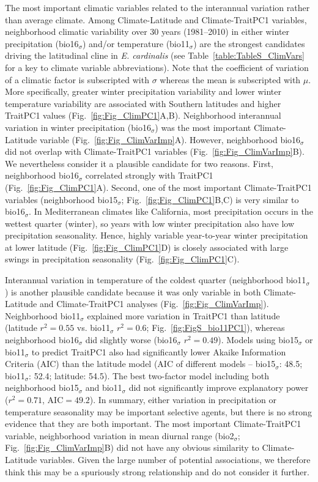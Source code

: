 \documentclass[11pt, oneside]{article}
\begin{document}
The most important climatic variables related to the interannual variation rather than average climate. Among Climate-Latitude and Climate-TraitPC1 variables, neighborhood climatic variability over 30 years (1981--2010) in either winter precipitation (bio16$_\sigma$) and/or temperature (bio11$_\sigma$) are the strongest candidates driving the latitudinal cline in \textit{E. cardinalis} (see Table~\ref{table:TableS_ClimVars} for a key to climate variable abbreviations). Note that the coefficient of variation of a climatic factor is subscripted with $\sigma$ whereas the mean is subscripted with $\mu$. More specifically, greater winter precipitation variability and lower winter temperature variability are associated with Southern latitudes and higher TraitPC1 values (Fig.~\ref{fig:Fig_ClimPC1}A,B). Neighborhood interannual variation in winter precipitation (bio16$_\sigma$) was the most important Climate-Latitude variable (Fig.~\ref{fig:Fig_ClimVarImp}A). However, neighborhood bio16$_\sigma$ did not overlap with Climate-TraitPC1 variables (Fig.~\ref{fig:Fig_ClimVarImp}B). We nevertheless consider it a plausible candidate for two reasons. First, neighborhood bio16$_\sigma$ correlated strongly with TraitPC1 (Fig.~\ref{fig:Fig_ClimPC1}A). Second, one of the most important Climate-TraitPC1 variables (neighborhood bio15$_\sigma$; Fig.~\ref{fig:Fig_ClimPC1}B,C) is very similar to bio16$_\sigma$. In Mediterranean climates like California, most precipitation occurs in the wettest quarter (winter), so years with low winter precipitation also have low precipitation seasonality. Hence, highly variable year-to-year winter precipitation at lower latitude (Fig.~\ref{fig:Fig_ClimPC1}D) is closely associated with large swings in precipitation seasonality (Fig.~\ref{fig:Fig_ClimPC1}C). 

Interannual variation in temperature of the coldest quarter (neighborhood bio11$_\sigma$) is another plausible candidate because it was only variable in both Climate-Latitude and Climate-TraitPC1 analyses (Fig.~\ref{fig:Fig_ClimVarImp}). Neighborhood bio11$_\sigma$ explained more variation in TraitPC1 than latitude (latitude $r^2=0.55$ vs. bio11$_\sigma$ $r^2=0.6$; Fig.~\ref{fig:FigS_bio11PC1}), whereas neighborhood bio16$_\sigma$ did slightly worse (bio16$_\sigma$ $r^2=0.49$). Models using bio15$_\sigma$ or bio11$_\sigma$ to predict TraitPC1 also had significantly lower Akaike Information Criteria (AIC) than the latitude model (AIC of different models -- bio15$_\sigma$: 48.5; bio11$_\sigma$: 52.4; latitude: 54.5). The best two-factor model including both neighborhood bio15$_\sigma$ and bio11$_\sigma$ did not significantly improve explanatory power ($r^2=0.71$, AIC$=49.2$). In summary, either variation in precipitation or temperature seasonality may be important selective agents, but there is no strong evidence that they are both important. The most important Climate-TraitPC1 variable, neighborhood variation in mean diurnal range (bio2$_\sigma$; Fig.~\ref{fig:Fig_ClimVarImp}B) did not have any obvious similarity to Climate-Latitude variables. Given the large number of potential associations, we therefore think this may be a spuriously strong relationship and do not consider it further.
\end{document}
